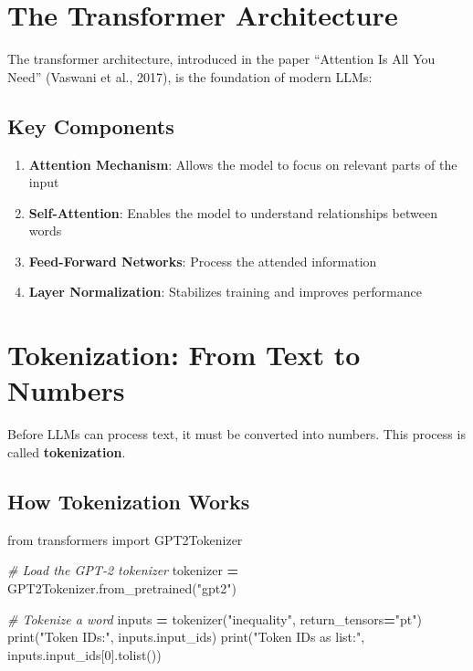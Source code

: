 \documentclass[
]{book}
\newenvironment{Shaded}{\begin{snugshade}}{\end{snugshade}}
\newcommand{\BuiltInTok}[1]{#1}
\newcommand{\CommentTok}[1]{\textcolor[rgb]{0.56,0.35,0.01}{\textit{#1}}}
\newcommand{\DecValTok}[1]{\textcolor[rgb]{0.00,0.00,0.81}{#1}}
\newcommand{\ImportTok}[1]{#1}
\newcommand{\NormalTok}[1]{#1}
\newcommand{\OperatorTok}[1]{\textcolor[rgb]{0.81,0.36,0.00}{\textbf{#1}}}
\newcommand{\StringTok}[1]{\textcolor[rgb]{0.31,0.60,0.02}{#1}}
\providecommand{\tightlist}{%
  \setlength{\itemsep}{0pt}\setlength{\parskip}{0pt}}
\begin{document}
\section{The Transformer Architecture}\label{the-transformer-architecture}

The transformer architecture, introduced in the paper ``Attention Is All You Need'' (Vaswani et al., 2017), is the foundation of modern LLMs:

\subsection{Key Components}\label{key-components}

\begin{enumerate}
\def\labelenumi{\arabic{enumi}.}
\tightlist
\item
  \textbf{Attention Mechanism}: Allows the model to focus on relevant parts of the input
\item
  \textbf{Self-Attention}: Enables the model to understand relationships between words
\item
  \textbf{Feed-Forward Networks}: Process the attended information
\item
  \textbf{Layer Normalization}: Stabilizes training and improves performance
\end{enumerate}

\section{Tokenization: From Text to Numbers}\label{tokenization-from-text-to-numbers}

Before LLMs can process text, it must be converted into numbers. This process is called \textbf{tokenization}.

\subsection{How Tokenization Works}\label{how-tokenization-works}

\begin{Shaded}
\begin{Highlighting}[]
\ImportTok{from}\NormalTok{ transformers }\ImportTok{import}\NormalTok{ GPT2Tokenizer}

\CommentTok{\# Load the GPT{-}2 tokenizer}
\NormalTok{tokenizer }\OperatorTok{=}\NormalTok{ GPT2Tokenizer.from\_pretrained(}\StringTok{"gpt2"}\NormalTok{)}

\CommentTok{\# Tokenize a word}
\NormalTok{inputs }\OperatorTok{=}\NormalTok{ tokenizer(}\StringTok{"inequality"}\NormalTok{, return\_tensors}\OperatorTok{=}\StringTok{"pt"}\NormalTok{)}
\BuiltInTok{print}\NormalTok{(}\StringTok{"Token IDs:"}\NormalTok{, inputs.input\_ids)}
\BuiltInTok{print}\NormalTok{(}\StringTok{"Token IDs as list:"}\NormalTok{, inputs.input\_ids[}\DecValTok{0}\NormalTok{].tolist())}
\end{Highlighting}
\end{Shaded}
\end{document}
